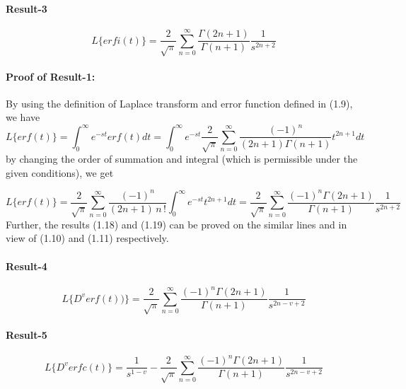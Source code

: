\documentclass{article}
\begin{document}
\paragraph{Result-3}
\begin{equation}
    L \big\{ erfi(t) \big\} = 
    \frac{2}{\sqrt{\pi}}
    \sum_{n = 0}^{\infty}
    \frac{\Gamma{(2n+1)}}{\Gamma{(n+1)}}
    \frac{1}{s^{2n+2}}
\end{equation}
\paragraph{Proof of Result-1:}
By using the definition of Laplace transform and error function defined in (1.9), we have
\begin{equation*}
    L \big\{ erf(t) \big\}=
    \int_0^{\infty}
    {e^{-st}}erf(t)dt = 
    \int_0^{\infty}
    {e^{-st}}
    \frac{2}{\sqrt{\pi}}
    \sum_{n = 0}^{\infty}
    \frac{{(-1)}^n}{(2n+1)\Gamma{(n+1)}}
    t^{2n+1}dt
\end{equation*}
by changing the order of summation and integral (which is permissible under the given conditions), we get

\begin{equation*}
    L \big\{ erf(t) \big\}=
    \frac{2}{\sqrt{\pi}}
    \sum_{n = 0}^{\infty}
    \frac{{(-1)}^n}{(2n+1)\,n\,!}
    \int_0^{\infty}
    e^{-st}t^{2n+1}dt=
    \frac{2}{\sqrt{\pi}}
    \sum_{n = 0}^{\infty}
    \frac{{(-1)}^n\Gamma{(2n+1)}}{\Gamma{(n+1)}}
    \frac{1}{s^{2n+2}}
\end{equation*}
Further, the results (1.18) and (1.19) can be proved on the similar lines and in view of (1.10) and (1.11) respectively.\\ 
\paragraph{Result-4}
\begin{equation}
    L\big\{{D^v}erf(t))\big\} = 
    \frac{2}{\sqrt{\pi}}
    \sum_{n = 0}^{\infty}
    \frac{{(-1)}^n\Gamma{(2n+1)}}{\Gamma{(n+1)}}
    \frac{1}{s^{2n-v+2}}
\end{equation}
\paragraph{Result-5}
\begin{equation}
    L \big\{ D^v erfc(t) \big\} = 
    \frac{1}{s^{1-v}}-
    \frac{2}{\sqrt{\pi}}
    \sum_{n = 0}^{\infty}
    \frac{{(-1)}^n\Gamma{(2n+1)}}{\Gamma{(n+1)}}
    \frac{1}{s^{2n-v+2}}
\end{equation}
\end{document}
